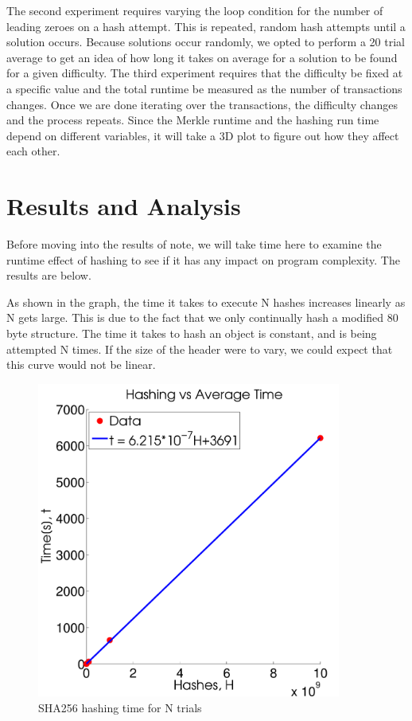 \documentclass[pdftex,11pt]{article}
\begin{document}
The second experiment requires varying the loop condition for the number of leading zeroes on a hash attempt. This is repeated, random hash attempts until a solution occurs. Because solutions occur randomly, we opted to perform a 20 trial average to get an idea of how long it takes on average for a solution to be found for a given difficulty. 
The third experiment requires that the difficulty be fixed at a specific value and the total runtime be measured as the number of transactions changes. Once we are done iterating over the transactions, the difficulty changes and the process repeats. Since the Merkle runtime and the hashing run time depend on different variables, it will take a 3D plot to figure out how they affect each other. 

\section{Results and Analysis}
Before moving into the results of note, we will take time here to examine the runtime effect of hashing to see if it has any impact on program complexity. The results are below.

As shown in the graph, the time it takes to execute N hashes increases linearly as N gets large. This is due to the fact that  we only continually hash a modified 80 byte structure. The time it takes to hash an object is constant, and is being attempted N times. If the size of the header were to vary, we could expect that this curve would not be linear.

\begin{figure}[H]
	\centering
	\includegraphics[width=100mm]{figures/SHA256.pdf}
	\caption{SHA256 hashing time for N trials}
	\label{sha256}
\end{figure}
\end{document}
